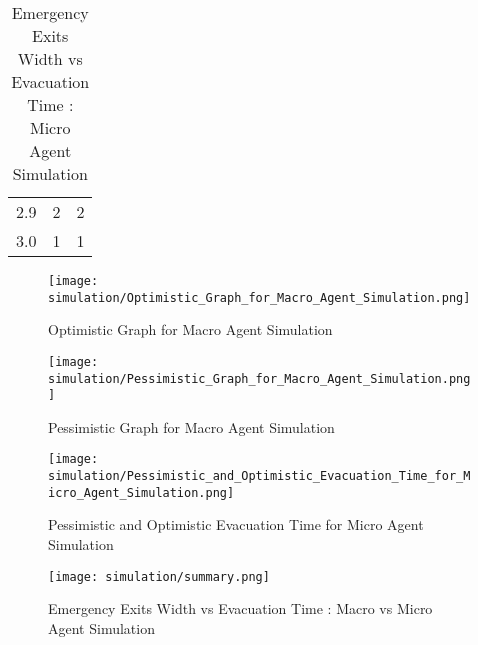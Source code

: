 \begin{table}[H]
{\begin{tabular}{|l|l|l|}
2.9                      & 2                                                                                                                    & 2                                                                                                                      \\
3.0                      & 1                                                                                                                    & 1                                                                                                                      \\
\hline
\end{tabular}}
\caption{Emergency Exits Width vs Evacuation Time : Micro Agent Simulation}
\label{Emergency Exits Width vs Evacuation Time : Micro Agent Simulation}
\end{table}

\begin{figure}[H]
  \centering
  \texttt{[image: simulation/Optimistic\_Graph\_for\_Macro\_Agent\_Simulation.png]}
  \caption{Optimistic Graph for Macro Agent Simulation}
  \label{Optimistic Graph for Macro Agent Simulation}
\end{figure}

\begin{figure}[H]
  \centering
  \texttt{[image: simulation/Pessimistic\_Graph\_for\_Macro\_Agent\_Simulation.png]}
  \caption{Pessimistic Graph for Macro Agent Simulation}
  \label{Pessimistic Graph for Macro Agent Simulation}
\end{figure}

\begin{figure}[H]
  \centering
  \texttt{[image: simulation/Pessimistic\_and\_Optimistic\_Evacuation\_Time\_for\_Micro\_Agent\_Simulation.png]}
  \caption{Pessimistic and Optimistic Evacuation Time for Micro Agent Simulation}
  \label{Pessimistic and Optimistic Evacuation Time for Micro Agent Simulation}
\end{figure}

\begin{figure}[H]
  \centering
  \texttt{[image: simulation/summary.png]}
  \caption{Emergency Exits Width vs Evacuation Time : Macro vs Micro Agent Simulation}
  \label{Emergency Exits Width vs Evacuation Time : Macro vs Micro Agent Simulation}
\end{figure}